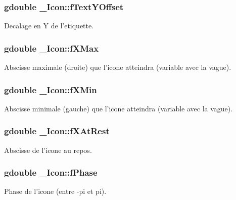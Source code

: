 \subsubsection{\setlength{\rightskip}{0pt plus 5cm}gdouble {\bf \_\-Icon::fTextYOffset}}\label{struct__Icon_0c5ce4dac4822d860c384824a1cfcff4}


Decalage en Y de l'etiquette. 

\subsubsection{\setlength{\rightskip}{0pt plus 5cm}gdouble {\bf \_\-Icon::fXMax}}\label{struct__Icon_7f54b7ebaa94e52a5e12d83f58358aee}


Abscisse maximale (droite) que l'icone atteindra (variable avec la vague). 

\subsubsection{\setlength{\rightskip}{0pt plus 5cm}gdouble {\bf \_\-Icon::fXMin}}\label{struct__Icon_2f88c0e4660fd55faeecdb3f412ec841}


Abscisse minimale (gauche) que l'icone atteindra (variable avec la vague). 

\subsubsection{\setlength{\rightskip}{0pt plus 5cm}gdouble {\bf \_\-Icon::fXAtRest}}\label{struct__Icon_d5147013dfc5e46f0467d3514288585c}


Abscisse de l'icone au repos. 

\subsubsection{\setlength{\rightskip}{0pt plus 5cm}gdouble {\bf \_\-Icon::fPhase}}\label{struct__Icon_9d1f6eec88d30e739f6bb5c18a9f54ac}


Phase de l'icone (entre -pi et pi). 

